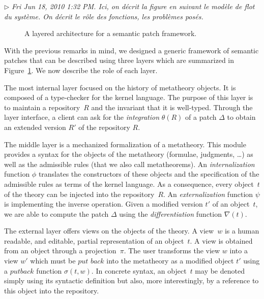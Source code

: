 \documentclass{article}
\newcommand{\remtext}[1]{\textcolor{bwgreen}{$\triangleright$ \textsl{#1}}}
\begin{document}
\remtext{Fri Jun 18, 2010  1:32 PM. Ici, on décrit la figure en suivant
  le modèle de flot du système. On décrit le rôle des fonctions, 
les problèmes posés.}

\begin{figure}
\begin{center}
\end{center}
\label{fig:architecture}
\caption{A layered architecture for a semantic patch framework.}
\end{figure}

With the previous remarks in mind, we designed a generic framework of semantic
patches that can be described using three layers which are summarized in 
Figure~\ref{fig:architecture}. We now describe the role of each layer.

The most internal layer focused on the history of metatheory
objects. It is composed of a type-checker for the kernel language. The
purpose of this layer is to maintain a repository~$R$ and the
invariant that it is well-typed. Through the layer interface, a client
can ask for the \textit{integration} $\theta(R)$ of a patch $\Delta$
to obtain an extended version $R'$ of the repository $R$.

The middle layer is a mechanized formalization of a metatheory. This
module provides a syntax for the objects of the metatheory (formulae,
judgments, \ldots) as well as the admissible rules (that we also call
metatheorems).  An \textit{internalization} function $\phi$ translates
the constructors of these objects and the specification of the
admissible rules as terms of the kernel language. As a consequence,
every object~$t$ of the theory can be injected into the
repository~$R$. An \textit{externalization} function $\psi$ is
implementing the inverse operation. Given a modified version $t'$ of
an object~$t$, we are able to compute the patch $\Delta$ using
the \textit{differentiation} function $\nabla(t)$. 

The external layer offers views on the objects of the theory. A
view~$w$ is a human readable, and editable, partial representation of
an object~$t$. A view is obtained from an object through a
projection~$\pi$.  The user transforms the view $w$ into a view $w'$
which must be $\textit{put back}$ into the metatheory as a modified
object $t'$ using a $\textit{putback}$ function $\sigma(t, w)$.  In
concrete syntax, an object~$t$ may be denoted simply using its
syntactic definition but also, more interestingly, by a reference to this 
object into the repository.
\end{document}
